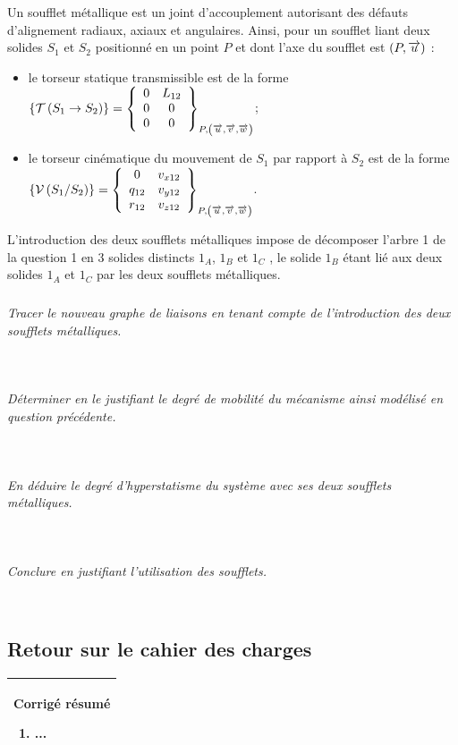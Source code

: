 \documentclass[10pt,fleqn]{article} %
\begin{document}
\begin{multicols}{2}
Un soufflet métallique est un joint d’accouplement autorisant des défauts d’alignement radiaux, axiaux et angulaires. Ainsi, pour un soufflet liant deux solides $S_1$ et $S_2$ positionné en un point $P$ et dont l’axe du soufflet est $\axe{P}{u}$ :
\begin{itemize}
\item le torseur statique transmissible est de la forme $\torseurstat{T}{S_1}{S_2}=\torseurcol{0}{0}{0}{L_{12}}{0}{0}{P,\base{u}{v}{w}}$;
\item le torseur cinématique du mouvement de $S_1$ par rapport à $S_2$ est de la forme $\torseurcin{V}{S_1}{S_2}=\torseurcol{0}{q_{12}}{r_{12}}{v_{x12}}{v_{y12}}{v_{z12}}{P,\base{u}{v}{w}}$.
\end{itemize}


L’introduction des deux soufflets métalliques impose de décomposer l’arbre 1 de la question 1 en 3 solides distincts $1_A$, $1_B$ et $1_C$ , le solide $1_B$ étant lié aux deux solides $1_A$ et $1_C$ par les deux soufflets métalliques.



\subparagraph{}\textit{Tracer le nouveau graphe de liaisons en tenant compte de l’introduction des deux soufflets métalliques.}
\ifprof
\begin{corrige} ~\\
\end{corrige}
\else
\fi


\subparagraph{}\textit{Déterminer en le justifiant le degré de mobilité du mécanisme ainsi modélisé en question précédente.}
\ifprof
\begin{corrige} ~\\
\end{corrige}
\else
\fi


\subparagraph{}\textit{En déduire le degré d’hyperstatisme du système avec ses deux soufflets métalliques.}
\ifprof
\begin{corrige} ~\\
\end{corrige}
\else
\fi


\subparagraph{}\textit{Conclure en justifiant l’utilisation des soufflets.}
\ifprof
\begin{corrige} ~\\
\end{corrige}
\else
\fi


\subsection*{Retour sur le cahier des charges}


\ifprof
\else
\begin{center}
\begin{tabular}{|p{.95\linewidth}|}
\hline
\textbf{Corrigé résumé}
\begin{enumerate}
\item ...
\end{enumerate} \\
\hline
\end{tabular}
\end{center}
\fi

\end{multicols}
\end{document}

